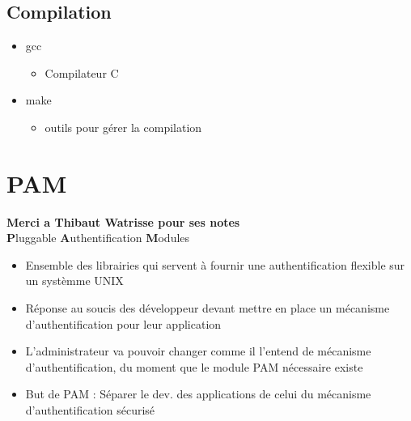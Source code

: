 \documentclass[a4paper]{article}
\begin{document}
      \subsection{Compilation}
      \begin{itemize}[label = \textbullet, font = \Large]
        \item gcc
        \begin{itemize}[label=, font=\scriptsize] 
          \item Compilateur C
        \end{itemize}
        \item make
        \begin{itemize}[label=, font=\scriptsize] 
          \item outils pour gérer la compilation
        \end{itemize}
      \end{itemize}


      \section{PAM}
      \textbf{Merci a Thibaut Watrisse pour ses notes}\\
      \textbf{P}luggable \textbf{A}uthentification \textbf{M}odules
      \begin{itemize}[label = \textbullet, font = \Large]
        \item Ensemble des librairies qui servent à fournir une authentification flexible sur un systèmme UNIX
        \item Réponse au soucis des développeur devant mettre en place un mécanisme d'authentification pour leur application
        \item L’administrateur va pouvoir changer comme il l’entend de mécanisme d’authentification, du moment que le module PAM nécessaire existe
        \item But de PAM : Séparer le dev. des applications de celui du mécanisme d'authentification sécurisé
      \end{itemize}
\end{document}
